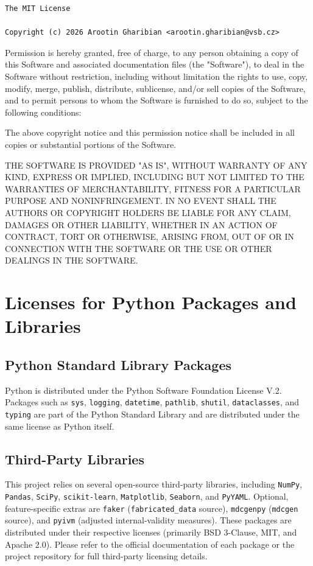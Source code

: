 \documentclass[a4paper,12pt]{article}
\begin{document}
\begin{verbatim}
The MIT License

Copyright (c) 2026 Arootin Gharibian <arootin.gharibian@vsb.cz>
\end{verbatim}
Permission is hereby granted, free of charge, to any person obtaining a copy of this Software and associated documentation files (the "Software"), to deal in the Software without restriction, including without limitation the rights
to use, copy, modify, merge, publish, distribute, sublicense, and/or sell copies of the Software, and to permit persons to whom the Software is furnished to do so, subject to the following conditions:

The above copyright notice and this permission notice shall be included in all copies or substantial portions of the Software.

THE SOFTWARE IS PROVIDED "AS IS", WITHOUT WARRANTY OF ANY KIND, EXPRESS OR IMPLIED, INCLUDING BUT NOT LIMITED TO THE WARRANTIES OF MERCHANTABILITY, FITNESS FOR A PARTICULAR PURPOSE AND NONINFRINGEMENT. IN NO EVENT SHALL THE
AUTHORS OR COPYRIGHT HOLDERS BE LIABLE FOR ANY CLAIM, DAMAGES OR OTHER LIABILITY, WHETHER IN AN ACTION OF CONTRACT, TORT OR OTHERWISE, ARISING FROM, OUT OF OR IN CONNECTION WITH THE SOFTWARE OR THE USE OR OTHER DEALINGS IN THE SOFTWARE.


\section*{Licenses for Python Packages and Libraries}
\subsection*{Python Standard Library Packages}
Python is distributed under the Python Software Foundation License V.2. Packages such as \texttt{sys}, \texttt{logging}, \texttt{datetime}, \texttt{pathlib}, \texttt{shutil}, \texttt{dataclasses}, and \texttt{typing} are part of the Python Standard Library and are distributed under the same license as Python itself.

\subsection*{Third-Party Libraries}
This project relies on several open-source third-party libraries, including \texttt{NumPy}, \texttt{Pandas}, \texttt{SciPy}, \texttt{scikit-learn}, \texttt{Matplotlib}, \texttt{Seaborn}, and \texttt{PyYAML}. Optional, feature-specific extras are \texttt{faker} (\texttt{fabricated\_data} source), \texttt{mdcgenpy} (\texttt{mdcgen} source), and \texttt{pyivm} (adjusted internal-validity measures). These packages are distributed under their respective licenses (primarily BSD 3-Clause, MIT, and Apache 2.0). Please refer to the official documentation of each package or the project repository for full third-party licensing details.
\end{document}
